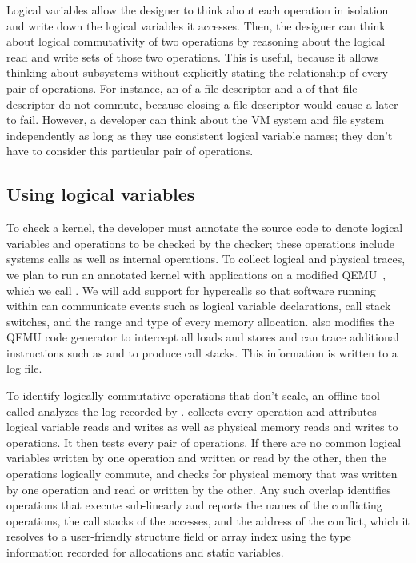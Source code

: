 Logical variables allow the designer to think about each operation in
isolation and write down the logical variables it accesses.  Then, the designer
can think about logical commutativity of two operations by reasoning about the
logical read and write sets of those two operations.  This is
useful, because it allows thinking about subsystems without explicitly stating
the relationship of every pair of operations.  For instance, an
 of a file descriptor and a  of that file
descriptor do not commute, because closing a file descriptor would
cause a later  to fail.
However, a developer can think about the VM
system and file system independently as long as they use consistent
logical variable names; they don't have to consider this particular
pair of operations.

\subsection{Using logical variables}

To check a kernel, the developer must annotate the source code to denote logical
variables and operations to be checked by the checker; these operations
include systems calls as well as internal operations.  To collect logical and
physical traces, we plan to run an annotated kernel with applications on a
modified QEMU~\cite{qemu}, which we call \mtrace.  We will add support for
hypercalls so that software running within \mtrace can communicate events such
as logical variable declarations, call stack switches, and the range and type of
every memory allocation.  \mtrace also modifies the QEMU code generator to
intercept all loads and stores and can trace additional instructions such as
 and  to produce call stacks.  This information is written
to a log file.

To identify logically commutative operations that don't scale, an
offline tool called \mscan analyzes the log recorded by \mtrace.  \mscan
collects every operation and attributes logical variable reads and writes as
well as physical memory reads and writes to operations.  It then tests every
pair of operations.  If there are no common logical variables written by one
operation and written or read by the other, then the operations logically
commute, and \mscan checks for physical memory that was written by one operation and
read or written by the other.  Any such overlap identifies operations
that execute sub-linearly and \mscan reports the names of the conflicting operations,
the call stacks of the accesses, and the address of the conflict, which it
resolves to a user-friendly structure field or array index using the type
information recorded for allocations and static variables.

